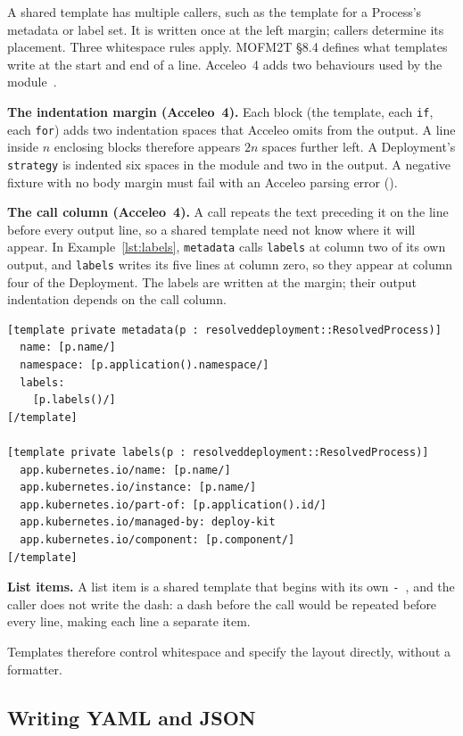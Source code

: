A shared template has multiple callers, such as the template for a Process's metadata
or label set. It is written once at the left margin; callers determine its placement.
Three whitespace rules apply. MOFM2T \S 8.4 defines what templates write at the start
and end of a line. Acceleo~4 adds two behaviours used by the module~\cite{acceleo}.

\textbf{The indentation margin (Acceleo~4).} Each block (the template, each \texttt{if}, each
\texttt{for}) adds two indentation spaces that Acceleo omits from the output. A line
inside $n$ enclosing blocks therefore appears $2n$ spaces further left. A Deployment's \texttt{strategy}
is indented six spaces in the module and two in the output. A negative fixture with
no body margin must fail with an Acceleo parsing error
().

\textbf{The call column (Acceleo~4).} A call repeats the text preceding it on the
line before every output line, so a shared template need not know where it will
appear. In Example~\ref{lst:labels}, \texttt{metadata} calls
\texttt{labels} at column two of its own output, and \texttt{labels} writes its five
lines at column zero, so they appear at column four of the Deployment. The labels are
written at the margin; their output indentation depends on the call column.

\begin{lstlisting}[style=report, language=acceleo, caption={The Metadata and Label Shared Templates}, label={lst:labels}]
[template private metadata(p : resolveddeployment::ResolvedProcess)]
  name: [p.name/]
  namespace: [p.application().namespace/]
  labels:
    [p.labels()/]
[/template]

[template private labels(p : resolveddeployment::ResolvedProcess)]
  app.kubernetes.io/name: [p.name/]
  app.kubernetes.io/instance: [p.name/]
  app.kubernetes.io/part-of: [p.application().id/]
  app.kubernetes.io/managed-by: deploy-kit
  app.kubernetes.io/component: [p.component/]
[/template]
\end{lstlisting}

\textbf{List items.} A list item is a shared template that begins with its own
\texttt{- }, and the caller does not write the dash: a dash before the call would be
repeated before every line, making each line a separate item.

Templates therefore control whitespace and specify the layout directly, without a
formatter.

\subsection{Writing YAML and JSON}
\label{sec:m2t-spelling}


